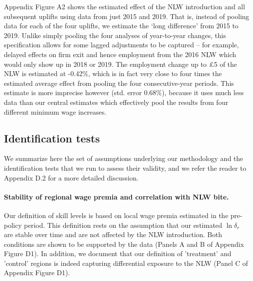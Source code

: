 Appendix Figure A2 shows the estimated effect of the NLW introduction and all subsequent uplifts using data from just 2015 and 2019. That is, instead of pooling data for each of the four uplifts, we estimate the `long difference' from 2015 to 2019. Unlike simply pooling the four analyses of year-to-year changes, this specification allows for some lagged adjustments to be captured -- for example, delayed effects on firm exit and hence employment from the 2016 NLW which would only show up in 2018 or 2019. The employment change up to £5 of the NLW is estimated at -0.42\%, which is in fact very close to four times the estimated average effect from pooling the four consecutive-year periods. This estimate is more imprecise however (std. error 0.68\%), because it uses much less data than our central estimates which effectively pool the results from four different minimum wage increases.


\subsection{Identification tests} \label{sec:lm_idtests}

We summarize here the set of assumptions underlying our methodology and the identification tests that we run to assess their validity, and we refer the reader to Appendix D.2 for a more detailed discussion.

\paragraph{Stability of regional wage premia and correlation with NLW bite.} Our definition of skill levels is based on local wage premia estimated in the pre-policy period. This definition rests on the assumption that our estimated $\ln \delta_r$ are stable over time and are not affected by the NLW introduction. Both conditions are shown to be supported by the data (Panels A and B of Appendix Figure D1). In addition, we document that our definition of 'treatment' and 'control' regions is indeed capturing differential exposure to the NLW (Panel C of Appendix Figure D1). 

